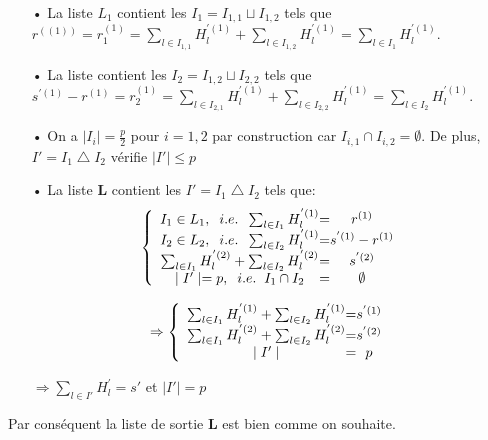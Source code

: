 \documentclass[12pt,openany]{report}
\begin{document}
\begin{itemize}
\item[•] La liste $L_1 $ contient les $I_{1}=I_{1,1} \sqcup I_{1,2}  $ tels que $ r^{((1))}=r_{1}^{(1)}=\sum_{l \in I_{1,1}}H_{l}^{'(1)} + \sum_{l \in I_{1,2}}H_{l}^{'(1)}=\sum_{l \in I_{1}}H_{l}^{'(1)}  $. 

\item[•] La liste contient les 
 $I_{2}=I_{1,2} \sqcup I_{2,2}    $ tels que $ s^{'(1)}-r^{(1)}=r_{2}^{(1)}= \sum_{l \in I_{2,1}} H_{l}^{'(1)} + \sum_{l \in I_{2,2}}H_{l}^{'(1)}= \sum_{ l \in I_2} H_{l}^{'(1)} .$ 
 
 \item[•] On a  $ \mid I_i \mid = \frac{p}{2} $ pour $ i=1,2 $ par construction car $ I_{i,1}  \cap I_{i,2}=\emptyset $. De plus, $I'=I_1 \bigtriangleup I_2 $ vérifie $ \mid I' \mid \leq p $
 
 
 \item[•] La liste \textbf{L} contient les $ I'= I_1 \bigtriangleup I_2  $  tels que:
 \[
\left \{
\begin{array}{c @{=} c}
   I_1 \in L_1 , \hspace{0.2cm} i.e. \hspace{0.2cm} \sum_{ l \in I_1} H_{l}^{'(1)}& r^{(1)}\\
    I_2 \in L_2 ,\hspace{0.2cm} i.e. \hspace{0.2cm} \sum_{ l \in I_2} H_{l}^{'(1)} &s^{'(1)}-r^{(1)}\\
    \sum_{ l \in I_1} H_{l}^{'(2)} + \sum_{l \in I_2} H_{l}^{'(2)}& s^{'(2)}\\
    \mid I' \mid=p ,\hspace{0.2cm} i.e. \hspace{0.2cm} I_1\cap I_2&\emptyset
   
\end{array}
\right.
\]

\[\Rightarrow
\left \{
\begin{array}{c @{=} c}
  \sum_{ l \in I_1} H_{l}^{'(1)} + \sum_{l \in I_2} H_{l}^{'(1)}& s^{'(1)}\\
  \sum_{ l \in I_1} H_{l}^{'(2)} + \sum_{l \in I_2} H_{l}^{'(2)}& s^{'(2)}\\
  \mid I' \mid & p 
\end{array}
\right.\\
\]

$\Rightarrow \sum_{l \in I'} H_{l}^{'}=s'$ et $ \mid I'\mid=p $

\end{itemize}
Par conséquent la liste de sortie \textbf{L} est bien comme on souhaite.
\end{document}
